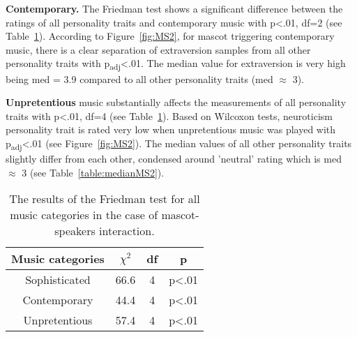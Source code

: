 \par\textbf{Contemporary.}
The Friedman test shows a significant difference between the ratings of all personality traits and
contemporary music with p<.01, df=2 (see Table~\ref{table:friedmanMS2}).
According to Figure~\ref{fig:MS2}, for mascot triggering contemporary music, there is a clear
separation of extraversion samples from all other personality traits with p\textsubscript{adj}<.01.
The median value for extraversion is very high being med = 3.9 compared to all
other personality traits (med $\approx$ 3).

\par\textbf{Unpretentious}
music substantially affects the measurements of all personality traits with
p<.01, df=4 (see Table~\ref{table:friedmanMS2}).
Based on Wilcoxon tests, neuroticism personality trait is rated very low when unpretentious music
was played with p\textsubscript{adj}<.01 (see Figure~\ref{fig:MS2}).
The median values of all other personality traits slightly differ from each other,
condensed around 'neutral' rating which is med $\approx$ 3 (see Table~\ref{table:medianMS2}).

\begin{table}[hbt!]
    \renewcommand{\arraystretch}{1}
    \begin{center}
        \begin{tabular}{|c|c|c|c|}
            \hline
            \textbf{Music categories} & \textbf{$\chi^2$} & \textbf{df} & \textbf{p} \\
            \hline
            Sophisticated &66.6 &4 &p<.01 \\
            \hline
            Contemporary &44.4 &4 &p<.01\\
            \hline
            Unpretentious &57.4 &4 &p<.01 \\
            \hline
        \end{tabular}
        \caption{The results of the Friedman test for all music categories in the case of mascot-speakers interaction.}
        \label{table:friedmanMS2}
    \end{center}
\end{table}

